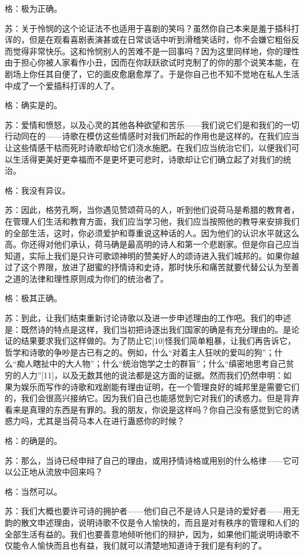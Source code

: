 \documentclass[12pt,oneside]{book}
\begin{document}
格：极为正确。

苏：关于怜悯的这个论证法不也适用于喜剧的笑吗？虽然你自己本来是羞于插科打诨的，但是在观看喜剧表演甚或在日常谈话中听到滑稽笑话时，你不会嫌它粗俗反而觉得非常快乐。这和怜悯别人的苦难不是一回事吗？因为这里同样地，你的理性由于担心你被人家看作小丑，因而在你跃跃欲试时克制了的你的那个说笑本能，在剧场上你任其自便了，它的面皮愈磨愈厚了。于是你自己也不知不觉地在私人生活中成了一个爱插科打诨的人了。

格：确实是的。

苏：爱情和愤怒，以及心灵的其他各种欲望和苦乐——我们说它们是和我们的一切行动同在的——诗歌在模仿这些情感时对我们所起的作用也是这样的。在我们应当让这些情感干枯而死时诗歌却给它们浇水施肥。在我们应当统治它们，以便我们可以生活得更美好更幸福而不是更坏更可悲时，诗歌却让它们确立起了对我们的统治。

格：我没有异议。

苏：因此，格劳孔啊，当你遇见赞颂荷马的人，听到他们说荷马是希腊的教育者，在管理人们生活和教育方面，我们应当学习他，我们应当按照他的教导来安排我们的全部生活，这时，你必须爱护和尊重说这种话的人。因为他们的认识水平就这么高。你还得对他们承认，荷马确是最高明的诗人和第一个悲剧家。但是你自己应当知道，实际上我们是只许可歌颂神明的赞美好人的颂诗进入我们城邦的。如果你越过了这个界限，放进了甜蜜的抒情诗和史诗，那时快乐和痛苦就要代替公认为至善之道的法律和理性原则成为你们的统治者了。

格：极其正确。

苏：到此，让我们结束重新讨论诗歌以及进一步申述理由的工作吧。我们的申述是：既然诗的特点是这样，我们当初把诗逐出我们国家的确是有充分理由的。是论证的结果要求我们这样做的。为了防止它[10]怪我们简单粗暴，让我们再告诉它，哲学和诗歌的争吵是古已有之的。例如，什么“对着主人狂吠的爱叫的狗”；什么“痴人瞎扯中的大人物”；什么“统治饱学之士的群盲”；什么“缜密地思考自己贫穷的人力”[11]，以及无数其他的说法都是这方面的证据。然而我们仍然申明：如果为娱乐而写作的诗歌和戏剧能有理由证明，在一个管理良好的城邦里是需要它们的，我们会很高兴接纳它。因为我们自己也能感觉到它对我们的诱惑力。但是背弃看来是真理的东西是有罪的。我的朋友，你说是这样吗？你自己没有感觉到它的诱惑力吗，尤其是当荷马本人在进行蛊惑你的时候？

格：的确是的。

苏：那么，当诗已经申辩了自己的理由，或用抒情诗格或用别的什么格律——它可以公正地从流放中回来吗？

格：当然可以。

苏：我们大概也要许可诗的拥护者——他们自己不是诗人只是诗的爱好者——用无韵的散文申述理由，说明诗歌不仅是令人愉快的，而且是对有秩序的管理和人们的全部生活有益的。我们也要善意地倾听他们的辩护，因为，如果他们能说明诗歌不仅能令人愉快而且也有益，我们就可以清楚地知道诗于我们是有利的了。
\end{document}
